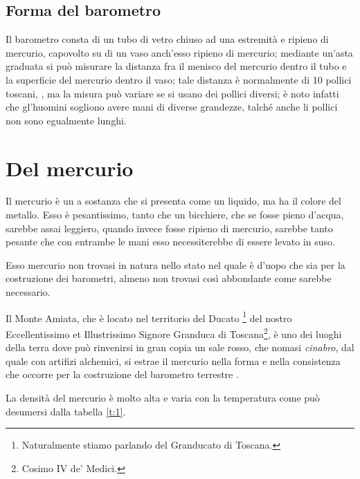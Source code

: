 \documentclass[%
    corpo=11.5pt,
    twoside,
    evenboxes,
    tipotesi=triennale,%
    stile=classica,
    oldstyle,
    autoretitolo,
    greek,
]{toptesi}
\begin{document}
\subsection{Forma del barometro}
Il barometro consta di un tubo di vetro chiuso ad una estremit\`a e
ripieno di mercurio, capovolto su di un vaso anch'esso ripieno di
mercurio; mediante un'asta graduata si pu\`o misurare la distanza fra
il menisco del mercurio dentro il tubo e la superficie del mercurio
dentro il vaso; tale distanza \`e normalmente di 10 pollici toscani,
\cite{tor1,tor2}, ma la misura pu\`o variare se si usano dei pollici
diversi; \`e noto infatti che gl'huomini sogliono avere mani di
diverse grandezze, talch\'e anche li pollici non sono egualmente
lunghi.
\section{Del mercurio}
Il mercurio \`e un a sostanza che si presenta come un liquido, ma ha il colore
del metallo. Esso \`e pesantissimo, tanto che un bicchiere, che se fosse pieno
d'acqua, sarebbe assai leggiero, quando invece fosse ripieno di mercurio,
sarebbe tanto pesante che con entrambe le mani esso necessiterebbe di essere
levato in suso.

Esso mercurio non trovasi in natura nello stato nel quale \`e d'uopo che sia
per la costruzione dei barometri, almeno non trovasi cos\`i abbondante come
sarebbe necessario.

\setcounter{footnote}{25}

Il Monte Amiata, che \`e locato nel territorio del Ducato%
\footnote{Naturalmente stiamo parlando del Granducato di Toscana.%
\ifclassica\NoteWhiteLine\fi
} del nostro Eccellentissimo et Illustrissimo Signore Granduca di Toscana\footnote{Cosimo IV de' Medici.}, \`e uno dei
luoghi della terra dove pu\`o rinvenirsi in gran copia un sale rosso, che
nomasi \emph{cinabro}, dal quale con artifizi alchemici, si estrae il mercurio
nella forma e nella consistenza che occorre per la costruzione del barometro
terrestre%
\ifclassica
{}\fi.


La densit\`a del mercurio \`e molto alta e varia con la temperatura come
pu\`o desumersi dalla tabella \ref{t:1}.
\end{document}
